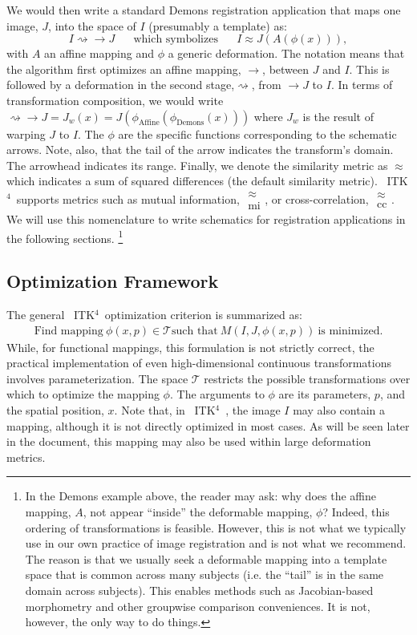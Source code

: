 \documentclass{frontiersSCNS}
\newcommand{\tk}{~ITK$^{\text{4}}$~}
\begin{document}
We would then write a standard Demons registration application that maps 
one image, $J$, into the space of $I$ (presumably a template) as:
$$
 I  \rightsquigarrow \rightarrow  J \text{~~~~~which symbolizes~~~~~} I \approx
 J( A( \phi( x ) )),
$$
with $A$ an affine mapping and $\phi$ a generic deformation. 
The notation means that the algorithm first optimizes an affine
mapping, $ \rightarrow$, 
between $J$ and $I$.  
This is followed by a deformation in the second stage,$\rightsquigarrow$, from $\rightarrow J$
to $I$.  In terms of transformation composition, we would write
$\rightsquigarrow \rightarrow  J = J_w(x) =
J( \phi_\text{Affine} ( \phi_\text{Demons} ( x) )) $ where $J_w$ is
the result of warping $J$ to $I$.  The $\phi$ are the specific
functions corresponding to the schematic arrows.  Note, also, that the
tail of the arrow indicates the transform's domain.  The arrowhead
indicates its range.  Finally, we denote the similarity metric as
$\approx$ which indicates a sum of squared differences (the default
similarity metric).  \tk supports metrics such as mutual information,
$\substack{ \approx \\ \text{mi} }$, or cross-correlation, $\substack{
\approx \\ \text{cc} }$.  We will use this nomenclature to write
schematics for registration applications in the following sections.
\footnote{In the Demons example above, the reader may ask: why does the affine
mapping, $A$, not appear ``inside'' the deformable mapping, $\phi$?
Indeed, this ordering of transformations is feasible.  However, this is not
what we typically use in our own practice of image registration and is
not what we recommend.  The
reason is that we usually seek a deformable mapping into a template
space that is common across many subjects (i.e. the ``tail'' is in the
same domain across subjects).  This enables methods such as
Jacobian-based morphometry and other groupwise comparison
conveniences.  It is not, however, the only way to do things.}


\subsection{Optimization Framework}
The general \tk optimization criterion is summarized as:
\begin{eqnarray}
\text{Find mapping}~\phi(x,p) \in \mathcal{T}
\text{such that}~M(I,J,\phi(x,p))~\text{is minimized}. 
\label{eq:gen}
\end{eqnarray}
While, for functional mappings, this formulation is not strictly correct, the
practical implementation of even high-dimensional continuous
transformations involves parameterization. 
The space $\mathcal{T}$ restricts the possible transformations over
which to optimize the mapping $\phi$.  The arguments to $\phi$ are its
parameters, $p$, and the spatial position, $x$.  Note that, in \tk,
the image $I$ may also contain a mapping, although it is not directly
optimized in most cases.  As will be seen later in the document, this
mapping may also be used within large deformation metrics. 
\end{document}
